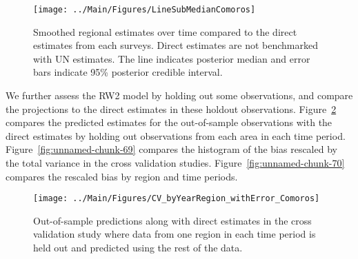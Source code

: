 \documentclass[12pt]{article}\usepackage[]{graphicx}\usepackage[]{color}
\newenvironment{knitrout}{}{} %
\begin{document}
\begin{knitrout}
\color{fgcolor}\begin{figure}[bht]

{\centering \texttt{[image: ../Main/Figures/LineSubMedianComoros]} 

}

\caption[Smoothed regional estimates over time compared to the direct estimates from each surveys]{Smoothed regional estimates over time compared to the direct estimates from each surveys. Direct estimates are not benchmarked with UN estimates. The line indicates posterior median and error bars indicate 95\% posterior credible interval.}\label{fig:unnamed-chunk-67}
\end{figure}


\end{knitrout}
We further assess the RW2 model by holding out some observations, and compare the projections to the direct estimates in these holdout observations. Figure~\ref{fig:unnamed-chunk-68} compares the predicted estimates for the out-of-sample observations  with the direct estimates by holding out observations from each area in each time period.  Figure~\ref{fig:unnamed-chunk-69} compares the histogram of the bias rescaled by the total variance in the cross validation studies. Figure~\ref{fig:unnamed-chunk-70} compares the rescaled bias by region and time periods.



 
\begin{knitrout}
\color{fgcolor}\begin{figure}[bht]

{\centering \texttt{[image: ../Main/Figures/CV\_byYearRegion\_withError\_Comoros]} 

}

\caption[Out-of-sample predictions along with direct estimates in the cross validation study where data from one region in each time period is held out and predicted using the rest of the data]{Out-of-sample predictions along with direct estimates in the cross validation study where data from one region in each time period is held out and predicted using the rest of the data.}\label{fig:unnamed-chunk-68}
\end{figure}


\end{knitrout}
\end{document}
